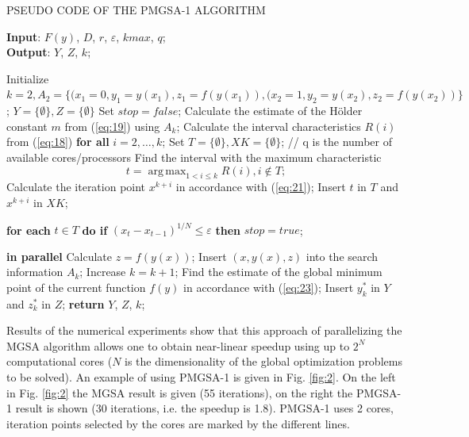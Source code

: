 \documentclass[review]{elsarticle}
\DeclareMathOperator*{\argmax}{arg\,max}
\begin{document}
\begin{algorithm}[]
\caption{PSEUDO CODE OF THE PMGSA-1 ALGORITHM} \label{alg:2}
\scriptsize
\hspace*{\algorithmicindent} \textbf{Input}: $F(y)$, $D$, $r$, $\varepsilon$, $kmax$, $q$;\\
\hspace*{\algorithmicindent} \textbf{Output}: $Y$, $Z$, $k$;
\begin{algorithmic}[1]
\State Initialize $ k=2, A_2=\{(x_1=0,y_1=y(x_1),z_1=f(y(x_1)),(x_2=1,y_2=y(x_2),z_2=f(y(x_2))\} $;
\State $Y = \{\emptyset \}, Z = \{\emptyset\}$
\State Set $stop = false$;
  \State Calculate the estimate of the H\"older constant $m$ from (\ref{eq:19}) using $A_k$;
  \State Calculate the interval characteristics $R(i)$ from (\ref{eq:18}) \textbf{for all} $i = 2, \dots, k$;
	\State Set $T = \{ \emptyset \}, XK = \{ \emptyset \}$;
	// q is the number of available cores/processors
	  \State Find the interval with the maximum characteristic 
		\begin{equation*}
			t= \argmax_{1<i \leq k} R(i), i \notin T;
	  \end{equation*}
		\State Calculate the iteration point $x^{k+i}$ in accordance with (\ref{eq:21});
    \State Insert $t$ in $T$ and $x^{k+i}$ in $XK$;

	\EndFor
  \State \textbf{for each} $t \in T$ \textbf{do if} $(x_t-x_{t-1} )^{1/N} \leq \varepsilon$ \textbf{then} $stop = true$;
	
	   \textbf{in parallel}
	    \State Calculate $z = f( y(x))$;
      \State Insert $(x, y(x), z)$ into the search information $A_k$;
      \State Increase $k = k + 1$;
	  \EndFor
  \EndIf
	\State Find the estimate of the global minimum point of the current function $f(y)$ in accordance with (\ref{eq:23});
	\State Insert $y_k^*$ in $Y$ and $z_k^*$ in $Z$;
  \EndWhile
\EndFor
\State \textbf{return} $Y$, $Z$, $k$;
\end{algorithmic}
\end{algorithm}

Results of the numerical experiments show that this approach of parallelizing the MGSA algorithm allows one to obtain near-linear speedup using up to $2^N$ computational cores ($N$ is the dimensionality of the global optimization problems to be solved). An example of using PMGSA-1 is given in Fig. \ref{fig:2}. On the left in Fig. \ref{fig:2} the MGSA result is given (55 iterations), on the right the PMGSA-1 result is shown (30 iterations, i.e. the speedup is 1.8). PMGSA-1 uses 2 cores, iteration points selected by the cores are marked by the different lines.
\end{document}

